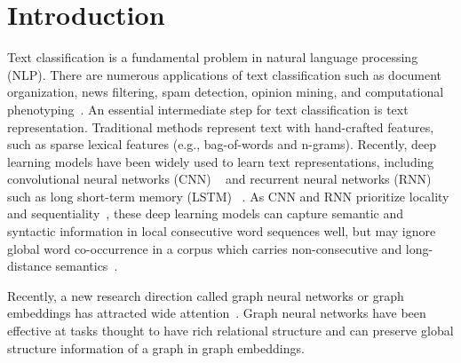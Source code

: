 \documentclass[letterpaper]{article} \usepackage{aaai19}  \usepackage{times}  \usepackage{helvet}  \usepackage{courier}  \usepackage{url}  \usepackage{graphicx}  \frenchspacing  \usepackage{amsmath}
\begin{document}
\section{Introduction}
Text classification is a fundamental problem in natural language processing (NLP). There are numerous applications of text classification such as document organization, news filtering, spam detection, opinion mining, and computational phenotyping~\cite{aggarwal2012survey,zeng2018natural}. An essential intermediate step for text classification is text representation. Traditional methods represent text with hand-crafted features, such as sparse lexical features (e.g., bag-of-words and n-grams). Recently, deep learning models have been widely used to learn text representations, including convolutional neural networks (CNN) ~\cite{kim2014convolutional} and recurrent neural networks (RNN) such as long short-term memory (LSTM) ~\cite{hochreiter1997long}. As CNN and RNN prioritize locality and sequentiality~\cite{battaglia2018relational}, these deep learning models can capture semantic and syntactic information in local consecutive word sequences well, but may ignore global word co-occurrence in a corpus which carries non-consecutive and long-distance semantics~\cite{peng2018large}.


Recently, a new research direction called graph neural networks or graph embeddings has attracted wide attention~\cite{battaglia2018relational,cai2018comprehensive}. Graph neural networks have been effective at tasks thought to have rich relational structure and can preserve global structure information of a graph in graph embeddings.
\end{document}

